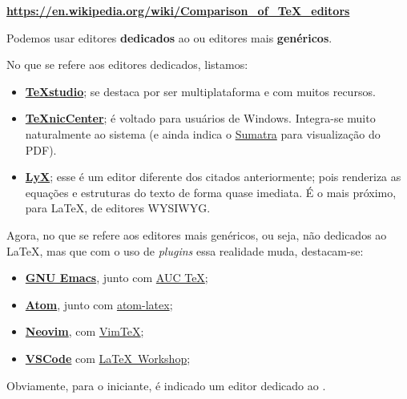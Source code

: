 \begin{center}
  \textbf{
    \url{https://en.wikipedia.org/wiki/Comparison\_of\_TeX\_editors}
  }
\end{center}

Podemos usar editores \textbf{dedicados} ao  ou editores mais 
\textbf{genéricos}.

No que se refere aos editores dedicados, listamos:

\begin{itemize}
  \item \href{https://www.texstudio.org/}{\textbf{TeXstudio}}; se destaca por 
  ser multiplataforma e com muitos recursos.
  \item \href{https://www.texniccenter.org/}{\textbf{TeXnicCenter}}; é voltado 
  para usuários de Windows. Integra-se muito naturalmente ao sistema (e ainda 
  indica o \href{https://www.sumatrapdfreader.org/free-pdf-reader}{Sumatra} para 
  visualização do PDF).
  \item \href{https://www.lyx.org/}{\textbf{LyX}}; esse é um editor diferente 
  dos citados anteriormente; pois  renderiza as equações e estruturas do texto 
  de forma quase imediata. É o mais próximo, para \LaTeX{}, de editores  WYSIWYG.
\end{itemize}

Agora, no que se refere aos editores mais genéricos, ou seja, não dedicados ao 
\LaTeX, mas que com o uso de \textit{plugins} essa realidade muda, destacam-se:

\begin{itemize}
  \item \href{https://www.gnu.org/software/emacs/emacs.html}{\bfseries GNU Emacs}, junto com \href{https://www.gnu.org/software/auctex/}{AUC \TeX};
  \item \href{https://atom.io/}{\bfseries Atom}, junto com \href{https://atom.io/packages/atom-latex}{atom-latex};
  \item \href{https://neovim.io/}{\bfseries Neovim}, com \href{https://github.com/lervag/vimtex}{VimTeX};
  \item \href{https://code.visualstudio.com/}{\bfseries VSCode} com \href{https://marketplace.visualstudio.com/items?itemName=James-Yu.latex-workshop}{\LaTeX\ Workshop};
\end{itemize}

Obviamente, para o iniciante, é indicado um editor dedicado ao .

